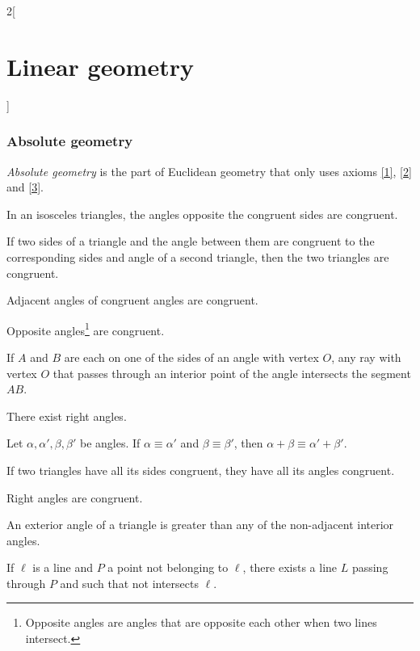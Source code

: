 \documentclass[class=article,10pt,crop=false]{standalone}
\begin{document}
\begin{multicols}{2}[\section{Linear geometry}]
\subsubsection*{Absolute geometry}
\begin{definition}
\textit{Absolute geometry} is the part of Euclidean geometry that only uses axioms \ref{1}, \ref{2} and \ref{3}.
\end{definition}
\begin{theorem}
In an isosceles triangles, the angles opposite the congruent sides are congruent.
\end{theorem}
\begin{theorem}
If two sides of a triangle and the angle between them are congruent to the corresponding sides and angle of a second triangle, then the two triangles are congruent.
\end{theorem}
\begin{theorem}
Adjacent angles of congruent angles are congruent.
\end{theorem}
\begin{theorem}
Opposite angles\footnote{Opposite angles are angles that are opposite each other when two lines intersect.} are congruent.
\end{theorem}
\begin{theorem}
If $A$ and $B$ are each on one of the sides of an angle with vertex $O$, any ray with vertex $O$ that passes through an interior point of the angle intersects the segment $AB$.
\end{theorem}
\begin{theorem}
There exist right angles.
\end{theorem}
\begin{theorem}
Let $\alpha,\alpha',\beta,\beta'$ be angles. If $\alpha\equiv\alpha'$ and $\beta\equiv\beta'$, then $\alpha+\beta\equiv\alpha'+\beta'$.
\end{theorem}
\begin{theorem}
If two triangles have all its sides congruent, they have all its angles congruent.
\end{theorem}
\begin{theorem}
Right angles are congruent.
\end{theorem}
\begin{theorem}
An exterior angle of a triangle is greater than any of the non-adjacent interior angles.
\end{theorem}
\begin{theorem}
If $\ell$ is a line and $P$ a point not belonging to $\ell$, there exists a line $L$ passing through $P$ and such that not intersects $\ell$.

\end{theorem}
\end{multicols}
\end{document}
